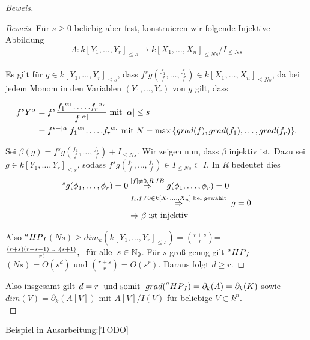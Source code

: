 \documentclass{article}
\newcommand*{\R}{k[X_{1},\ldots,X_{n}]}
\newcommand*{\indx}[2]{{#1}_{#2}}
\newcommand*{\potx}[2]{{#1}^{#2}}
\newcommand*{\N}{\mathbb{N}_0}
\newcommand*{\hp}[1]{$\prescript{a}{}{HP}_{#1}$}
\begin{document}
\begin{proof}[Beweis]
\begin{compactenum}
\begin{proof}[Beweis]
			Für $s\geq0$ beliebig aber fest, konstruieren wir folgende Injektive Abbildung
			\begin{displaymath}
			\Lambda :\indx{k[\indx{Y}{1},\ldots,\indx{Y}{r}]}{\leq s}\rightarrow\indx{\R}{\leq Ns}/\indx{I}{\leq Ns}
			\end{displaymath}
			\\
			Es gilt für $g\in \indx{k[\indx{Y}{1},\ldots,\indx{Y}{r}]}{\leq s}$, dass $\potx{f}{s}g(\frac{\indx{f}{1}}{f},\ldots,\frac{\indx{f}{r}}{f})\in \indx{\R}{\leq Ns}$, da  bei jedem Monom in den Variablen $(\indx{Y}{1},\ldots,\indx{Y}{r})$ von $g$ gilt, dass
			
			\begin{align*}
			\potx{f}{s}\potx{Y}{\alpha}&=\potx{f}{s}\frac{\potx{\indx{f}{1}}{\indx{\alpha}{1}}.\ldots.\potx{\indx{f}{r}}{\indx{\alpha}{r}}}{\potx{f}{|\alpha|}}\; \textnormal{mit}\; |\alpha|\leq s\\&
			=\potx{f}{s-|\alpha|}\potx{\indx{f}{1}}{\indx{\alpha}{1}}.\ldots.\potx{\indx{f}{r}}{\indx{\alpha}{r}} \; \textnormal{mit}\; N=\max{\{grad(f),grad(\indx{f}{1}),\ldots,grad(\indx{f}{r})\}}.
			\end{align*}
			
			Sei $\beta(g)=\potx{f}{s}g(\frac{\indx{f}{1}}{f},\ldots,\frac{\indx{f}{r}}{f})+\indx{I}{\leq Ns}$. Wir zeigen nun, dass $\beta$ injektiv ist. Dazu sei $g\in \indx{k[\indx{Y}{1},\ldots,\indx{Y}{r}]}{\leq s}$, sodass $\potx{f}{s}g(\frac{\indx{f}{1}}{f},\ldots,\frac{\indx{f}{r}}{f})\in\indx{I}{\leq Ns}\subset I$. In $R$ bedeutet dies
			\begin{align*}
			[f]^sg(\indx{\phi}{1},\ldots,\indx{\phi}{r})=0&\stackrel{[f]\neq0,R\;IB}{\Rightarrow} g(\indx{\phi}{1},\ldots,\indx{\phi}{r})=0\\&
			\stackrel{\indx{f}{i},f\neq0 \in \R \;\textnormal{bel gewählt}}{\Rightarrow}\;  g=0\\&
			\Rightarrow \beta\;\textnormal{ist injektiv}
			\end{align*} 
			
			Also \hp{I}$(Ns)\geq \indx{dim}{k}(\indx{k[\indx{Y}{1},\ldots,\indx{Y}{r}]}{\leq s})=\binom{r+s}{r}$=$\frac{(r+s)(r+s-1).\ldots.(s+1)}{r!},\; \textnormal{ für alle } \; s\in \N$. Für $s$ groß genug gilt \hp{I}$(Ns)=O(s^d)$ und $\binom{r+s}{r}=O(s^r)$. Daraus folgt $d\geq r$.
		\end{proof}
	\end{compactenum}
	Also insgesamt gilt $d=r\; \textnormal{ und somit } \; grad (\textnormal{\hp{I}})=\indx{\partial}{k}(A)=\indx{\partial}{k}(K)$ sowie $dim(V)= \indx{\partial}{k}(A[V])$ mit $A[V]/I(V)$ für beliebige $V\subset k^n$.\\
\end{proof}
Beispiel in Ausarbeitung:[TODO]\\
\end{document}
